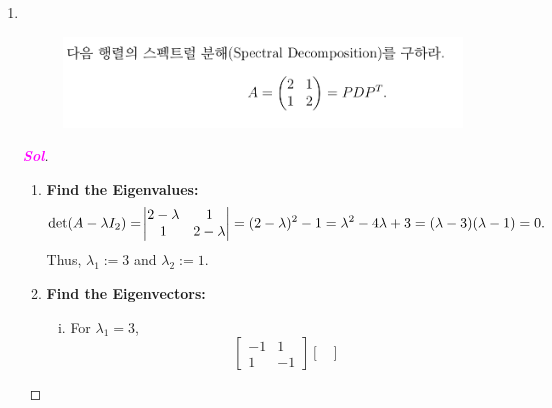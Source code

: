 \documentclass[10pt]{article}
\theoremstyle{definition}
\newcommand{\sol}{\textcolor{magenta}{\bf Sol}}
\begin{document}
\begin{enumerate}[\bf 1.]
\begin{proof}[\sol]
\begin{align*}
{\begin{vmatrix}
		1&x_3&x_3^2
	\end{vmatrix}}&=\begin{vmatrix}
	x_2 & x_2^2\\x_3&x_3^2
\end{vmatrix}-x_1\begin{vmatrix}
	1&x_2^2\\1&x_3^2
\end{vmatrix}+x_1^2\begin{vmatrix}
	1&x_2\\1&x_3
\end{vmatrix}\\
	&=(x_2x_3^2-x_2^2x_3)-x_1(x_3^2-x_2^2)+x_1^2(x_3-x_2)\\
	&=x_2x_3(x_3-x_2)-x_1(x_2+x_3)(x_2-x_3)+x_1^2(x_3-x_2)\\
	&=x_2x_3(x_3-x_2)+x_1(x_2+x_3)(x_3-x_2)+x_1^2(x_3-x_2)\\
	&=x_2x_3(x_3-x_2)+x_1(x_3-x_2)(x_1+x_2+x_3)\\
	&=(x_3-x_2)(x_2x_3+x_1(x_1+x_2+x_3)).
\end{align*}
\end{proof}
\newpage
\item \ \begin{figure}[h!]
	\includegraphics[scale=.35]{asgmt1_7.png}
\end{figure}
\begin{proof}[\sol]
	\ \begin{enumerate}[(Step 1)]
		\item \textbf{Find the Eigenvalues:} \[
		\det(A-\lambda I_2)=\abs{\begin{matrix}
				2-\lambda& 1\\1&2-\lambda
		\end{matrix}}=(2-\lambda)^2-1=\lambda^2-4\lambda+3=(\lambda-3)(\lambda-1)=0.
		\] Thus, \(\lambda_1:=3\) and $\lambda_2:=1$.
		\item \textbf{Find the Eigenvectors:}
		\begin{enumerate}[(i)]
			\item For $\lambda_1=3$, \[
			\begin{bmatrix}
				-1&1\\1&-1
			\end{bmatrix}\begin{bmatrix}

\end{bmatrix}\]
\end{enumerate}
\end{enumerate}
\end{proof}
\end{enumerate}
\end{document}
